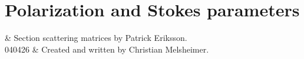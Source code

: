 \graphicspath{{Figs/polarization/}}
%
%
\chapter{Polarization and Stokes parameters}
 \label{sec:polarization}

%
%
 & Section scattering matrices by Patrick Eriksson. \\
  040426 & Created and written by Christian Melsheimer.\\
\stophistory


%
%


\newcommand{\ColVct}[3]{\left( \begin{array}{c}
                                   #1 \\ #2 \\ #3
                               \end{array} \right) }
\newcommand{\PrtDrv}[2]{\frac{\partial #1}{\partial #2}}
\newcommand{\eVrt} {\ensuremath{\VctStl{e}_v}}
\newcommand{\eHor} {\ensuremath{\VctStl{e}_h}}
\newcommand{\eLh} {\ensuremath{\VctStl{e}_{LH}}}
\newcommand{\eRh} {\ensuremath{\VctStl{e}_{RH}}}
\newcommand{\ePls} {\ensuremath{\VctStl{e}_{+45\degree}}}
\newcommand{\eMin} {\ensuremath{\VctStl{e}_{-45\degree}}}
\newcommand{\mi}  {\ensuremath{\mathrm{i}}}


